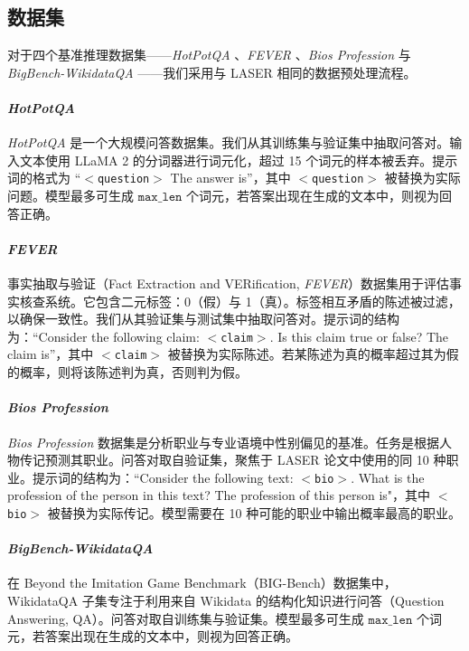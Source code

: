 \documentclass[conference]{IEEEtran}
\begin{document}
\subsection{数据集} \label{datasets}
对于四个基准推理数据集——\textit{HotPotQA} \cite{yang2018HotPotQA}、\textit{FEVER} \cite{thorne2018FEVER}、\textit{Bios Profession} \cite{de2019bias} 与 \textit{BigBench-WikidataQA} \cite{bowman2015large}——我们采用与 LASER \cite{sharma2023truth} 相同的数据预处理流程。
\paragraph{\textit{HotPotQA}} 
\textit{HotPotQA} 是一个大规模问答数据集。我们从其训练集与验证集中抽取问答对。输入文本使用 LLaMA 2 \cite{llama2} 的分词器进行词元化，超过 15 个词元的样本被丢弃。提示词的格式为 ``$<$\texttt{question}$>$ The answer is”，其中 $<$\texttt{question}$>$ 被替换为实际问题。模型最多可生成 $\texttt{max\_len}$ 个词元，若答案出现在生成的文本中，则视为回答正确。
\paragraph{\textit{FEVER}}
事实抽取与验证（Fact Extraction and VERification, \textit{FEVER}）数据集用于评估事实核查系统。它包含二元标签：0（假）与 1（真）。标签相互矛盾的陈述被过滤，以确保一致性。我们从其验证集与测试集中抽取问答对。提示词的结构为：“Consider the following claim: $<$\texttt{claim}$>$. Is this claim true or false? The claim is”，其中 $<$\texttt{claim}$>$ 被替换为实际陈述。若某陈述为真的概率超过其为假的概率，则将该陈述判为真，否则判为假。
\paragraph{\textit{Bios Profession}}
\textit{Bios Profession} 数据集是分析职业与专业语境中性别偏见的基准。任务是根据人物传记预测其职业。问答对取自验证集，聚焦于 LASER 论文中使用的同 10 种职业。提示词的结构为：``Consider the following text: $<$\texttt{bio}$>$. What is the profession of the person in this text? The profession of this person is"，其中 $<$\texttt{bio}$>$ 被替换为实际传记。模型需要在 10 种可能的职业中输出概率最高的职业。
\paragraph{\textit{BigBench-WikidataQA}}
在 Beyond the Imitation Game Benchmark（BIG-Bench）数据集中，WikidataQA 子集专注于利用来自 Wikidata 的结构化知识进行问答（Question Answering, QA）。问答对取自训练集与验证集。模型最多可生成 $\texttt{max\_len}$ 个词元，若答案出现在生成的文本中，则视为回答正确。
\end{document}
